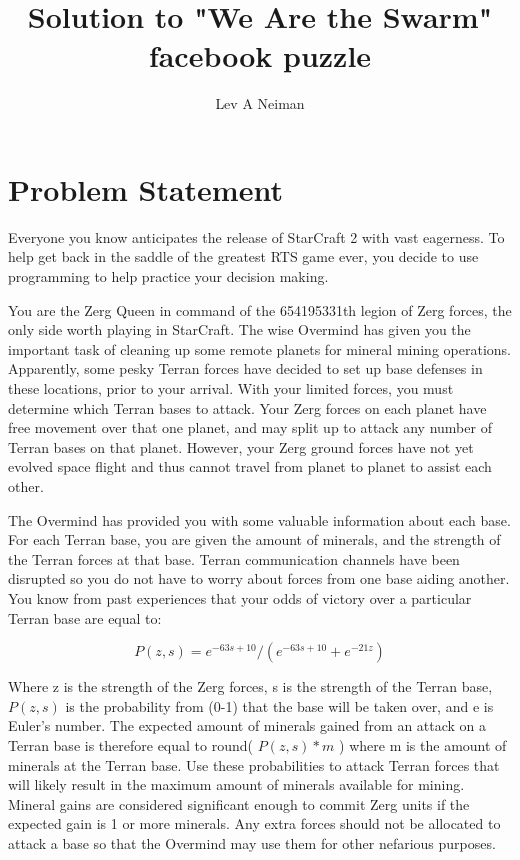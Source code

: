 \documentclass[11pt]{article}
\begin{document}
\title{Solution to "We Are the Swarm" facebook puzzle}
\author{Lev A Neiman}

\maketitle

\section{Problem Statement}

Everyone you know anticipates the release of StarCraft 2 with vast eagerness. To help get back in the saddle of the greatest RTS game ever, you decide to use programming to help practice your decision making. 

You are the Zerg Queen in command of the 654195331th legion of Zerg forces, the only side worth playing in StarCraft. The wise Overmind has given you the important task of cleaning up some remote planets for mineral mining operations. Apparently, some pesky Terran forces have decided to set up base defenses in these locations, prior to your arrival. With your limited forces, you must determine which Terran bases to attack. Your Zerg forces on each planet have free movement over that one planet, and may split up to attack any number of Terran bases on that planet. However, your Zerg ground forces have not yet evolved space flight and thus cannot travel from planet to planet to assist each other. 

The Overmind has provided you with some valuable information about each base. For each Terran base, you are given the amount of minerals, and the strength of the Terran forces at that base. Terran communication channels have been disrupted so you do not have to worry about forces from one base aiding another. You know from past experiences that your odds of victory over a particular Terran base are equal to: 

$$ P(z,s) = e^{-63s+10}/(e^{-63s+10}+e^{-21z}) $$

Where z is the strength of the Zerg forces, s is the strength of the Terran base, $ P(z,s) $ is the probability from (0-1) that the base will be taken over, and e is Euler's number. The expected amount of minerals gained from an attack on a Terran base is therefore equal to round( $ P(z,s) * m $ ) where m is the amount of minerals at the Terran base. Use these probabilities to attack Terran forces that will likely result in the maximum amount of minerals available for mining. Mineral gains are considered significant enough to commit Zerg units if the expected gain is 1 or more minerals. Any extra forces should not be allocated to attack a base so that the Overmind may use them for other nefarious purposes. 
\end{document}
